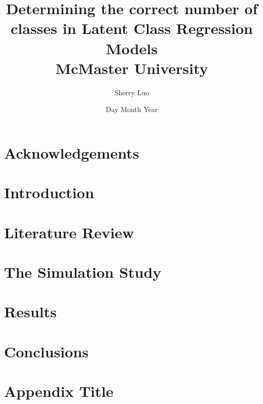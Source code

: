 \documentclass[12pt %
oneside, %
doublespacing, %
]{report}
\title{
    {Determining the correct number of classes in Latent Class Regression Models}\\
    {\large McMaster University}\\
}
\author{Sherry Luo}
\date{Day Month Year}
\begin{document}
\maketitle


\chapter*{Acknowledgements}

\tableofcontents
\chapter{Introduction}





\chapter{Literature Review}








\chapter{The Simulation Study}


\chapter{Results}




\chapter{Conclusions}



\appendix
\chapter{Appendix Title}
\end{document}
